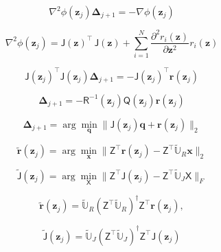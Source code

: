 \documentclass[11pt]{article}
\renewcommand{\vec}[1]{\mathbf{#1}}
\newcommand{\mat}[1]{\mathsf{#1}}
\begin{document}
\begin{equation}
\nabla^2\phi(\vec{z}_j)\boldsymbol{\Delta}_{j+1} = -\nabla\phi(\vec{z}_j)
\label{eq:Gauss_newton_step}
\end{equation}

\begin{equation}
\nabla^2\phi(\vec{z}_j) = \mat{J}(\vec{z})^{\top}\,\mat{J}(\vec{z})+ \sum_{i=1}^{N} \frac{\partial^2 r_i(\mathbf{z})}{\partial \mathbf{z}^2} r_i(\mathbf{z})
\label{eq:Gauss_newton_step}
\end{equation}

\begin{equation}
\mat{J}(\mathbf{z}_{j})^{\top} \mat{J}(\mathbf{z}_{j}) \boldsymbol{\Delta}_{j+1} = -\mat{J}(\mathbf{z}_{j})^{\top} \mathbf{r}(\mathbf{z}_{j})
\label{eq:normal_J}
\end{equation}

\begin{equation}
\boldsymbol{\Delta}_{j+1} = - \mat{R}^{-1}(\vec{z}_j)\mat{Q}(\vec{z}_j)\mathbf{r}(\mathbf{z}_{j})
\label{eq:normal_J2}
\end{equation}

\begin{equation}
    \boldsymbol{\Delta}_{j+1} = \arg\min_{\vec{q}}\| \mat{J}(\vec{z}_j)\vec{q} + \vec{r}(\vec{z}_j)  \|_2
    \label{eq:normal_optimization}
\end{equation}

\begin{equation}
\widetilde{\vec{r}}(\vec{z}_j) = \arg\min_{\vec{x}} \| \mat{Z}^\top \vec{r}(\vec{z}_j) - \mat{Z}^\top \widetilde{\mathbb{U}}_R \vec{x} \|_2
\end{equation}

\begin{equation}
\widetilde{\mat{J}}(\vec{z}_j) = \arg\min_{\mat{X}} \| \mat{Z}^\top {\mat{J}}(\vec{z}_j) - \mat{Z}^\top \widetilde{\mathbb{U}}_J \mat{X} \|_F
\end{equation}

\begin{equation}
\widetilde{\vec{r}}(\vec{z}_j) = \widetilde{\mathbb{U}}_R \left(\mat{Z}^\top \widetilde{\mathbb{U}}_R\right)^\dagger \mat{Z}^\top{\vec{r}}(\vec{z}_j),
\end{equation}

\begin{equation}
\widetilde{\mat{J}}(\vec{z}_j) = \widetilde{\mathbb{U}}_J \left(\mat{Z}^\top \widetilde{\mathbb{U}}_J\right)^\dagger \mat{Z}^\top{\mat{J}}(\vec{z}_j)
\end{equation}
\end{document}
